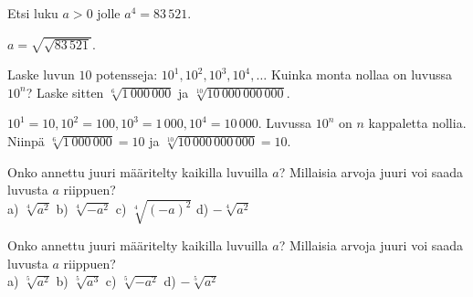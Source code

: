 \begin{tehtavasivu}
\begin{tehtava}
Etsi luku $a>0$ jolle $a^4=83\,521$.
\begin{vastaus}
$a=\sqrt{\sqrt{83\,521}}$.
\end{vastaus}
\end{tehtava}



\begin{tehtava}
Laske luvun $10$ potensseja: $10^1, 10^2, 10^3, 10^4, \ldots$ Kuinka monta nollaa on luvussa $10^n$? Laske sitten $\sqrt[6]{1\,000\,000}$ ja $\sqrt[10]{10\,000\,000\,000}$.

\begin{vastaus}
$10^1 = 10, 10^2 = 100, 10^3 = 1\,000, 10^4 = 10\,000$. Luvussa $10^n$ on $n$ kappaletta nollia. Niinpä $\sqrt[6]{1\,000\,000} = 10$ ja $\sqrt[10]{10\,000\,000\,000} = 10$.
\end{vastaus}
\end{tehtava}

\begin{tehtava}
Onko annettu juuri määritelty kaikilla luvuilla $a$? Millaisia arvoja juuri voi saada luvusta $a$ riippuen?\\
a) $\sqrt[4]{a^2}$ \quad b) $\sqrt[4]{-a^2}$ \quad c) $\sqrt[4]{(-a)^2}$ \quad d) $- \sqrt[4]{a^2}$

\begin{vastaus}

\begin{alakohdat}
\end{alakohdat}
\end{vastaus}
\end{tehtava}

\begin{tehtava}
Onko annettu juuri määritelty kaikilla luvuilla $a$? Millaisia arvoja juuri voi saada luvusta $a$ riippuen?\\
a) $\sqrt[5]{a^2}$ \quad b) $\sqrt[5]{a^3}$ \quad c) $\sqrt[5]{-a^2}$ \quad d) $- \sqrt[5]{a^2}$


\end{tehtava}
\end{tehtavasivu}

